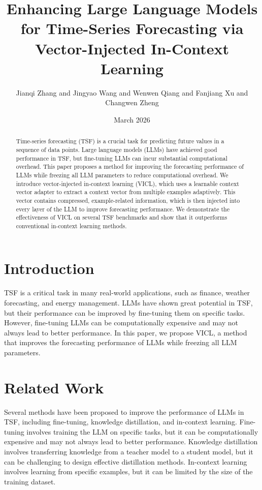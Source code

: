 \documentclass{article}
\begin{document}
\title{Enhancing Large Language Models for Time-Series Forecasting via Vector-Injected In-Context Learning}
\author{Jianqi Zhang and Jingyao Wang and Wenwen Qiang and Fanjiang Xu and Changwen Zheng}
\date{March 2026}

\maketitle

\begin{abstract}
Time-series forecasting (TSF) is a crucial task for predicting future values in a sequence of data points. Large language models (LLMs) have achieved good performance in TSF, but fine-tuning LLMs can incur substantial computational overhead. This paper proposes a method for improving the forecasting performance of LLMs while freezing all LLM parameters to reduce computational overhead. We introduce vector-injected in-context learning (VICL), which uses a learnable context vector adapter to extract a context vector from multiple examples adaptively. This vector contains compressed, example-related information, which is then injected into every layer of the LLM to improve forecasting performance. We demonstrate the effectiveness of VICL on several TSF benchmarks and show that it outperforms conventional in-context learning methods.
\end{abstract}

\section{Introduction}
TSF is a critical task in many real-world applications, such as finance, weather forecasting, and energy management. LLMs have shown great potential in TSF, but their performance can be improved by fine-tuning them on specific tasks. However, fine-tuning LLMs can be computationally expensive and may not always lead to better performance. In this paper, we propose VICL, a method that improves the forecasting performance of LLMs while freezing all LLM parameters.

\section{Related Work}
Several methods have been proposed to improve the performance of LLMs in TSF, including fine-tuning, knowledge distillation, and in-context learning. Fine-tuning involves training the LLM on specific tasks, but it can be computationally expensive and may not always lead to better performance. Knowledge distillation involves transferring knowledge from a teacher model to a student model, but it can be challenging to design effective distillation methods. In-context learning involves learning from specific examples, but it can be limited by the size of the training dataset.
\end{document}
